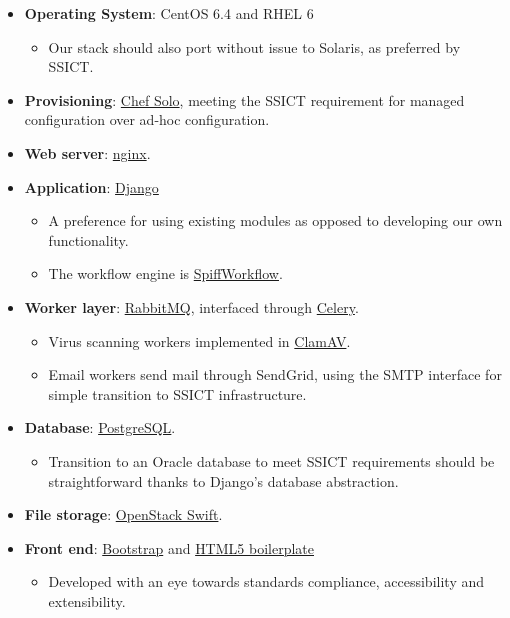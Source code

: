 \documentclass[12pt,a4paper,twosided]{article}
\begin{document}
\begin{itemize}

\item
  \textbf{Operating System}: CentOS 6.4 and RHEL 6

  \begin{itemize}
  
  \item
    Our stack should also port without issue to Solaris, as preferred by
    SSICT.
  \end{itemize}
\item
  \textbf{Provisioning}: \href{http://www.opscode.com/chef/}{Chef Solo},
  meeting the SSICT requirement for managed configuration over ad-hoc
  configuration.
\item
  \textbf{Web server}: \href{http://nginx.org/en}{nginx}.
\item
  \textbf{Application}: \href{http://django.org}{Django}

  \begin{itemize}
  
  \item
    A preference for using existing modules as opposed to developing our
    own functionality.
  \item
    The workflow engine is
    \href{https://github.com/knipknap/SpiffWorkflow}{SpiffWorkflow}.
  \end{itemize}
\item
  \textbf{Worker layer}: \href{http://rabbitmq.com}{RabbitMQ},
  interfaced through \href{http://www.celeryproject.org/}{Celery}.

  \begin{itemize}
  
  \item
    Virus scanning workers implemented in
    \href{http://www.clamav.net/lang/en/}{ClamAV}.
  \item
    Email workers send mail through SendGrid, using the SMTP interface
    for simple transition to SSICT infrastructure.
  \end{itemize}
\item
  \textbf{Database}: \href{http://postgresql.org}{PostgreSQL}.

  \begin{itemize}
  
  \item
    Transition to an Oracle database to meet SSICT requirements should
    be straightforward thanks to Django's database abstraction.
  \end{itemize}
\item
  \textbf{File storage}: \href{http://swift.openstack.org}{OpenStack
  Swift}.
\item
  \textbf{Front end}: \href{http://getbootstrap.com/}{Bootstrap} and
  \href{http://html5boilerplate.com/}{HTML5 boilerplate}

  \begin{itemize}
  
  \item
    Developed with an eye towards standards compliance, accessibility
    and extensibility.
  \end{itemize}
\end{itemize}
\end{document}
